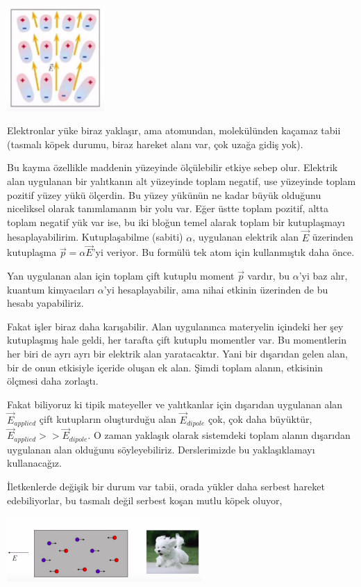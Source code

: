 \documentclass[12pt,fleqn]{article}\usepackage{../../common}
\begin{document}
\includegraphics[width=10em]{04_08.png}

Elektronlar yüke biraz yaklaşır, ama atomundan, molekülünden kaçamaz tabii
(tasmalı köpek durumu, biraz hareket alanı var, çok uzağa gidiş yok). 

Bu kayma özellikle maddenin yüzeyinde ölçülebilir etkiye sebep
olur. Elektrik alan uygulanan bir yalıtkanın alt yüzeyinde toplam negatif,
use yüzeyinde toplam pozitif yüzey yükü ölçerdin. Bu yüzey yükünün ne kadar
büyük olduğunu niceliksel olarak tanımlamanın bir yolu var. Eğer üstte
toplam pozitif, altta toplam negatif yük var ise, bu iki bloğun temel
alarak toplam bir kutuplaşmayı hesaplayabilirim. Kutuplaşabilme (sabiti)
$\alpha$, uygulanan elektrik alan $\vec{E}$ üzerinden kutuplaşma
$\vec{p} = \alpha \vec{E}$'yi veriyor. Bu formülü tek atom için
kullanmıştık daha önce.

Yan uygulanan alan için toplam çift kutuplu moment $\vec{p}$ vardır, bu
$\alpha$'yi baz alır, kuantum kimyacıları $\alpha$'yi hesaplayabilir, ama
nihai etkinin üzerinden de bu hesabı yapabiliriz.

Fakat işler biraz daha karışabilir. Alan uygulanınca materyelin içindeki
her şey kutuplaşmış hale geldi, her tarafta çift kutuplu momentler var. Bu
momentlerin her biri de ayrı ayrı bir elektrik alan yaratacaktır. Yani bir
dışarıdan gelen alan, bir de onun etkisiyle içeride oluşan ek alan. Şimdi
toplam alanın, etkisinin ölçmesi daha zorlaştı. 

Fakat biliyoruz ki tipik mateyeller ve yalıtkanlar için dışarıdan uygulanan
alan $\vec{E}_{applied}$ çift kutupların oluşturduğu alan
$\vec{E}_{dipole}$ çok, çok daha büyüktür,
$\vec{E}_{applied} >> \vec{E}_{dipole}$.  O zaman yaklaşık olarak
sistemdeki toplam alanın dışarıdan uygulanan alan olduğunu
söyleyebiliriz. Derslerimizde bu yaklaşıklamayı kullanacağız.

İletkenlerde değişik bir durum var tabii, orada yükler daha serbest hareket
edebiliyorlar, bu tasmalı değil serbest koşan mutlu köpek oluyor,

\includegraphics[width=20em]{04_09.png}
\end{document}
